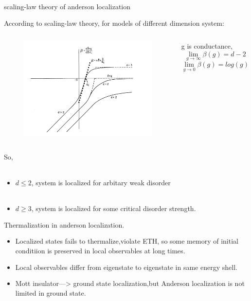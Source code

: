 \documentclass{beamer}
\begin{document}
\begin{frame}{scaling-law theory of anderson localization}

According to scaling-law theory, for models of different dimension system:
\begin{columns}
\begin{figure}
\includegraphics[width=1\linewidth]{scaling}
\end{figure}
g is conductance,
$$\lim_{g\to\infty}\beta(g)=d-2$$
$$\lim_{g\to0}\beta(g)=log(g)$$

\end{columns}
\end{frame}

\begin{frame}
So, \\~
\begin{itemize}

\item $d\leqslant 2$, system is localized for arbitary weak disorder\\~

\item $d\geqslant 3$, system is localized for some critical disorder strength.
\end{itemize}

\end{frame}


\begin{frame}
Thermalization in anderson localization.

\begin{itemize}

\item Localized states fails to thermalize,violate ETH, so some memory of initial conditiion is preserved in local observables at long times.

\pause \item Local observables differ from eigenstate to eigenstate in same energy shell.

\pause \item Mott insulator—> ground state localization,but Anderson localization is not limited in ground state.

\end{itemize}

\end{frame}
\end{document}
